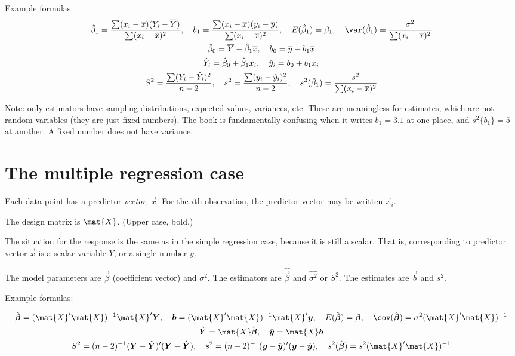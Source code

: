 \documentclass[12pt]{article}
\begin{document}
Example formulas:
\begin{gather*}
\hat{\beta}_1 =
    \frac{\sum(x_i - \overline{x})(Y_i - \overline{Y})}
        {\sum(x_i - \overline{x})^2}
,\quad
b_1 =
    \frac{\sum(x_i - \overline{x})(y_i - \overline{y})}
        {\sum(x_i - \overline{x})^2}
,\quad
E(\hat{\beta}_1) = \beta_1
,\quad
\var(\hat{\beta}_1) = \frac{\sigma^2}{\sum(x_i - \overline{x})^2}
\\
\hat{\beta}_0 = \overline{Y} - \hat{\beta}_1\overline{x}
,\quad
b_0 = \overline{y} - b_1\overline{x}
\\
\hat{Y}_i = \hat{\beta}_0 + \hat{\beta}_1 x_i
,\quad
\hat{y}_i = b_0 + b_1 x_i
\\
S^2 = \frac{\sum(Y_i - \hat{Y}_i)^2}{n - 2}
,\quad
s^2 = \frac{\sum(y_i - \hat{y}_i)^2}{n - 2}
,\quad
s^2(\hat{\beta}_1) = \frac{s^2}{\sum(x_i - \overline{x})^2}
\end{gather*}

Note: only estimators have sampling distributions, expected values,
variances, etc. These are meaningless for estimates,
which are not random variables (they are just fixed numbers).
The book is fundamentally confusing when
it writes $b_1 = 3.1$ at one place, and
$s^2\{b_1\} = 5$ at another.
A fixed number does not have variance.


\section{The multiple regression case}

Each data point has a predictor \emph{vector},
$\vec{x}$.
For the $i$th observation,
the predictor vector may be written $\vec{x}_i$.

The design matrix is $\mat{X}$.
(Upper case, bold.)

The situation for the response is the same as in the simple regression
case, because it is still a scalar.
That is, corresponding to predictor vector $\vec{x}$ is a
scalar variable $Y$, or a single number $y$.

The model parameters are
$\vec{\beta}$ (coefficient vector) and $\sigma^2$.
The estimators are $\hat{\vec{\beta}}$ and $\hat{\sigma^2}$ or $S^2$.
The estimates are $\vec{b}$ and $s^2$.

Example formulas:

\begin{gather*}
\hat{\vec{\beta}} = (\mat{X}'\mat{X})^{-1}\mat{X}'\vec{Y}
,\quad
\vec{b} = (\mat{X}'\mat{X})^{-1}\mat{X}'\vec{y}
,\quad
E(\hat{\vec{\beta}}) = \vec{\beta}
,\quad
\cov(\hat{\vec{\beta}}) = \sigma^2 (\mat{X}'\mat{X})^{-1}
\\
\hat{\vec{Y}} = \mat{X} \hat{\vec{\beta}}
,\quad
\hat{\vec{y}} = \mat{X} \vec{b}
\\
S^2 = (n-2)^{-1} (\vec{Y} - \hat{\vec{Y}})'(\vec{Y} - \hat{\vec{Y}})
,\quad
s^2 = (n-2)^{-1} (\vec{y} - \hat{\vec{y}})'(\vec{y} - \hat{\vec{y}})
,\quad
s^2(\hat{\vec{\beta}}) = s^2 (\mat{X}'\mat{X})^{-1}
\end{gather*}
\end{document}
